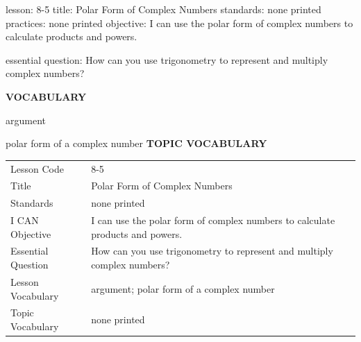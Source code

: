 \documentclass{article}
\newenvironment{lesson-meta}{}{}        %
\newcommand{\te}[1]{}                   %
\begin{document}
\begin{lesson-meta}
lesson: 8-5
title: Polar Form of Complex Numbers
standards: none printed
practices: none printed
objective: I can use the polar form of complex numbers to calculate products and powers.

essential question: How can you use trigonometry to represent and multiply complex numbers?

\textbf{VOCABULARY}
\item argument
\item polar form of a complex number
\textbf{TOPIC VOCABULARY}
\te{No topic vocabulary list is printed on these pages.}
\begin{tabular}{ll}
Lesson Code & 8-5 \\
Title & Polar Form of Complex Numbers \\
Standards & none printed \\
I CAN Objective & I can use the polar form of complex numbers to calculate products and powers. \\
Essential Question & How can you use trigonometry to represent and multiply complex numbers? \\
Lesson Vocabulary & argument; polar form of a complex number \\
Topic Vocabulary & none printed \\
\end{tabular}
\end{lesson-meta}
\end{document}
